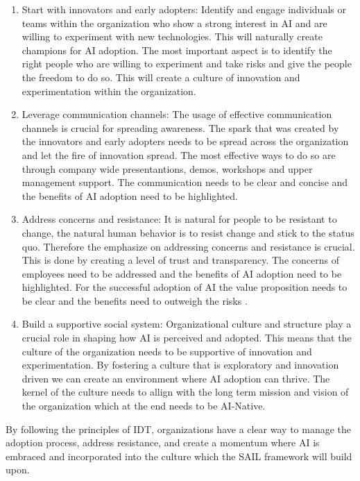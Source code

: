 \documentclass[]{imc-inf}
\begin{document}
\begin{enumerate}
	\def\labelenumi{\arabic{enumi}.}
	\item
	Start with innovators and early adopters: Identify and engage
	individuals or teams within the organization who show a strong
	interest in AI and are willing to experiment with new technologies.
	This will naturally create champions for AI adoption. The most
	important aspect is to identify the right people who are willing to
	experiment and take risks and give the people the freedom to do so.
	This will create a culture of innovation and experimentation within
	the organization.
	\item
	Leverage communication channels: The usage of effective communication
	channels is crucial for spreading awareness. The spark that was
	created by the innovators and early adopters needs to be spread across
	the organization and let the fire of innovation spread. The most
	effective ways to do so are through company wide presentantions,
	demos, workshops and upper management support. The communication needs
	to be clear and concise and the benefits of AI adoption need to be
	highlighted.
	\item
	Address concerns and resistance: It is natural for people to be
	resistant to change, the natural human behavior is to resist change
	and stick to the status quo. Therefore the emphasize on addressing
	concerns and resistance is crucial. This is done by creating a level
	of trust and transparency. The concerns of employees need to be
	addressed and the benefits of AI adoption need to be highlighted. For
	the successful adoption of AI the value proposition needs to be clear
	and the benefits need to outweigh the risks \citep{Patnaik2024}.
	\item
	Build a supportive social system: Organizational culture and structure
	play a crucial role in shaping how AI is perceived and adopted. This
	means that the culture of the organization needs to be supportive of
	innovation and experimentation. By fostering a culture that is
	exploratory and innovation driven we can create an environment where
	AI adoption can thrive. The kernel of the culture needs to allign with
	the long term mission and vision of the organization which at the end
	needs to be AI-Native.
\end{enumerate}

By following the principles of IDT, organizations have a clear way to
manage the adoption process, address resistance, and create a momentum
where AI is embraced and incorporated into the culture which the SAIL
framework will build upon.
\end{document}
